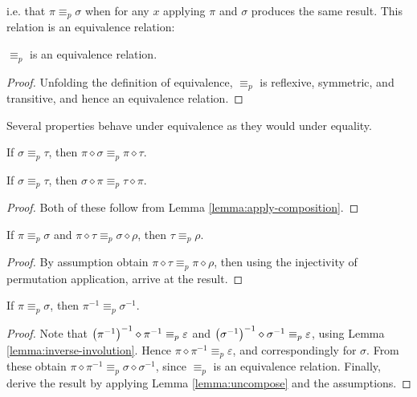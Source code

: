 i.e. that \(\pi \equiv_p \sigma\) when for any \(x\) applying \(\pi\) and \(\sigma\) produces the same result.
This relation is an equivalence relation:

\begin{lemma}
\label{lemma:prm-equivalence}
\(\equiv_p\) is an equivalence relation.
\end{lemma}
\begin{proof}
Unfolding the definition of equivalence, \(\equiv_p\) is reflexive, symmetric, and transitive, and hence an equivalence relation.
\end{proof}

Several properties behave under equivalence as they would under equality.

\begin{lemma}
If \(\sigma \equiv_p \tau\), then \(\pi \diamond \sigma \equiv_p \pi \diamond \tau\).
\end{lemma}
\begin{lemma}
If \(\sigma \equiv_p \tau\), then \(\sigma \diamond \pi \equiv_p \tau \diamond \pi\).
\end{lemma}
\begin{proof}
Both of these follow from Lemma \ref{lemma:apply-composition}.
\end{proof}

\begin{lemma}
\label{lemma:uncompose}
If \(\pi \equiv_p \sigma\) and \(\pi \diamond \tau \equiv_p \sigma \diamond \rho\),
then \(\tau \equiv_p \rho\).
\end{lemma}
\begin{proof}
By assumption obtain \(\pi \diamond \tau \equiv_p \pi \diamond \rho\), then using the injectivity of permutation application, arrive at the result.
\end{proof}

\begin{lemma}
If \(\pi \equiv_p \sigma\), then \(\pi^{-1} \equiv_p \sigma^{-1}\).
\end{lemma}
\begin{proof}
Note that \(\left(\pi^{-1}\right)^{-1} \diamond \pi^{-1} \equiv_p \varepsilon\) and \(\left(\sigma^{-1}\right)^{-1} \diamond \sigma^{-1} \equiv_p \varepsilon\), using Lemma \ref{lemma:inverse-involution}.
Hence \(\pi \diamond \pi^{-1} \equiv_p \varepsilon\), and correspondingly for \(\sigma\).
From these obtain \(\pi \diamond \pi^{-1} \equiv_p \sigma \diamond \sigma^{-1}\), since \(\equiv_p\) is an equivalence relation.
Finally, derive the result by applying Lemma \ref{lemma:uncompose} and the assumptions.
\end{proof}

